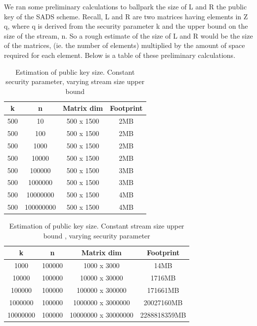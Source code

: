 \documentclass[11pt, letterpaper, oneside]{article}
\begin{document}
	We ran some preliminary calculations to ballpark the size of L and R the public key of the SADS scheme.
	Recall, L and R are two matrices having elements in Z q, where q is derived from the security parameter k and the upper bound on the size of the stream, n.
	So a rough estimate of the size of L and R would be the size of the matrices, (ie. the number of elements) multiplied by the amount of space required for each element.
	Below is a table of these preliminary calculations.
	
	\begin{table}[h]
	\centering
		\begin{tabular}{ c | c | c | c}
		k & n & Matrix dim & Footprint\\ \hline
		500&10&500 x 1500&2MB\\
		500&100&500 x 1500&2MB\\
		500&1000&500 x 1500&2MB\\
		500&10000&500 x 1500&2MB\\
		500&100000&500 x 1500&3MB\\
		500&1000000&500 x 1500&3MB\\
		500&10000000&500 x 1500&4MB\\
		500&100000000&500 x 1500&4MB\\
		
		\end{tabular}
	\caption{ Estimation of public key size.  Constant security parameter, varying stream size upper bound }
	\label{tab:pub-key_n}
	\end{table}
	
	\begin{table}[h]
	\centering
	
		\begin{tabular} { c | c | c | c}
		
		k & n & Matrix dim & Footprint\\ \hline
		1000&100000&1000 x 3000&14MB\\
		10000&100000&10000 x 30000&1716MB\\
		100000&100000&100000 x 300000&171661MB\\
		1000000&100000&1000000 x 3000000&20027160MB\\
		10000000&100000&10000000 x 30000000&2288818359MB\\	
		\end{tabular}
	
	\caption{Estimation of public key size.  Constant stream size upper bound , varying security parameter } 
	\label{tab:pub-key_k}
	\end{table}
	
\end{document}
